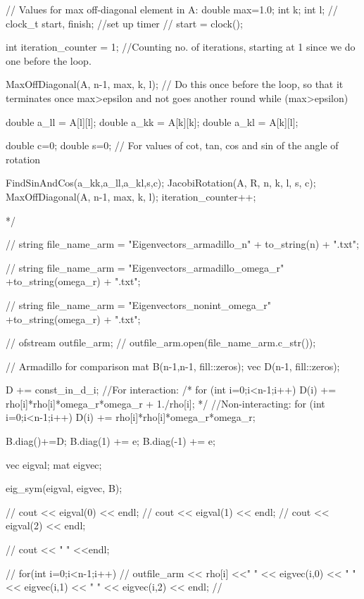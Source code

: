 \documentclass[norsk, 12pt]{article}
\begin{document}
{    // Values for max off-diagonal element in A:
    double max=1.0;
    int k;
    int l;
//    clock_t start, finish;      //set up timer
//    start = clock();

    int iteration_counter = 1; //Counting no. of iterations, starting at 1 since we do one before the loop.

    MaxOffDiagonal(A, n-1, max, k, l);      // Do this once before the loop, so that it terminates once max>epsilon and not goes another round
    while (max>epsilon){
        double a_ll = A[l][l];
        double a_kk = A[k][k];
        double a_kl = A[k][l];

        double c=0;
        double s=0;    // For values of cot, tan, cos and sin of the angle of rotation

        FindSinAndCos(a_kk,a_ll,a_kl,s,c);
        JacobiRotation(A, R, n, k, l, s, c);
        MaxOffDiagonal(A, n-1, max, k, l);
        iteration_counter++;

    }

*/

//    string file_name_arm = "Eigenvectors_armadillo_n" + to_string(n) + ".txt";

//    string file_name_arm = "Eigenvectors_armadillo_omega_r" +to_string(omega_r) + ".txt";

//    string file_name_arm = "Eigenvectors_nonint_omega_r" +to_string(omega_r) + ".txt";


//    ofstream outfile_arm;
//    outfile_arm.open(file_name_arm.c_str());



    // Armadillo for comparison
    mat B(n-1,n-1, fill::zeros);
    vec D(n-1, fill::zeros);

    D += const_in_d_i;
//For interaction:
/*
    for (int i=0;i<n-1;i++){
        D(i) += rho[i]*rho[i]*omega_r*omega_r + 1./rho[i];
    }
*/
//Non-interacting:
    for (int i=0;i<n-1;i++){
        D(i) += rho[i]*rho[i]*omega_r*omega_r;
    }

    B.diag()+=D;
    B.diag(1) += e;
    B.diag(-1) += e;

    vec eigval;
    mat eigvec;

    eig_sym(eigval, eigvec, B);

//    cout << eigval(0) << endl;
//    cout << eigval(1) << endl;
//    cout << eigval(2) << endl;

//    cout << "       " <<endl;

//    for(int i=0;i<n-1;i++){
//        outfile_arm << rho[i] <<"       " << eigvec(i,0) << "     " << eigvec(i,1) << "       " << eigvec(i,2) << endl;
//    }

}
\end{document}
